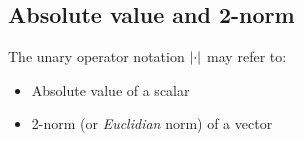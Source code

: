 \subsection{Absolute value and 2-norm}
The unary operator notation $\abs{\cdot}$ may refer to:
\begin{itemize}
\item Absolute value of a scalar
\item 2-norm (or \emph{Euclidian} norm) of a vector
\end{itemize}
